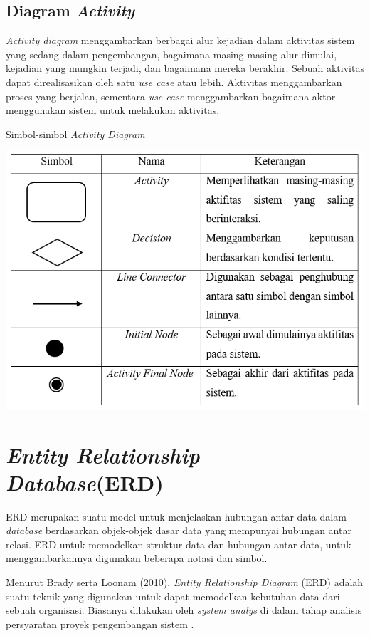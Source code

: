 \subsection{Diagram \emph{Activity}} 

\emph{Activity diagram} menggambarkan berbagai alur kejadian dalam aktivitas sistem yang sedang dalam pengembangan, bagaimana masing-masing alur dimulai, kejadian yang mungkin terjadi, dan bagaimana mereka berakhir. Sebuah aktivitas dapat direalisasikan oleh satu \emph{use case} atau lebih. Aktivitas menggambarkan proses yang berjalan, sementara \emph{use case} menggambarkan bagaimana aktor menggunakan sistem untuk melakukan aktivitas.

\begin{table}[H]
	\centering
	\caption{Simbol-simbol \emph{Activity Diagram}}
	\includegraphics[width=1.0\textwidth]{gambar/simbolactivity}
	\label{tabel_karaktermax2}
\end{table}


\section{\emph{Entity Relationship Database}(ERD)}

ERD merupakan suatu model untuk menjelaskan hubungan antar data dalam \emph{database} berdasarkan objek-objek dasar data yang mempunyai hubungan antar relasi. ERD untuk memodelkan struktur data dan hubungan antar data, untuk menggambarkannya digunakan beberapa notasi dan simbol.

Menurut Brady serta Loonam (2010), \emph{Entity Relationship Diagram} (ERD) adalah suatu teknik yang digunakan untuk dapat memodelkan kebutuhan data dari sebuah organisasi. Biasanya dilakukan oleh \emph{system analys} di dalam tahap analisis persyaratan proyek pengembangan sistem \cite{ibeng}. 

